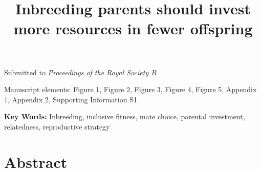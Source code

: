 \documentclass[12pt]{article}
\title{Inbreeding parents should invest more resources in fewer offspring}
\date{}
\begin{document}
\maketitle

\begin{center}
\vspace{5 mm}


\vspace{5 mm}


\vspace{15 mm}

\noindent Submitted to \emph{Proceedings of the Royal Society B}  

\vspace{15 mm} 

\noindent Manuscript elements: Figure 1, Figure 2, Figure 3, Figure 4, Figure 5, Appendix 1, Appendix 2, Supporting Information S1 

\vspace{15 mm}

\noindent \textbf{Key Words:} Inbreeding, inclusive fitness, mate choice, parental investment, relatedness, reproductive strategy
\newline

\end{center}

\linenumbers
\modulolinenumbers[2]
\doublespacing

\clearpage

\section*{Abstract} 
\end{document}
